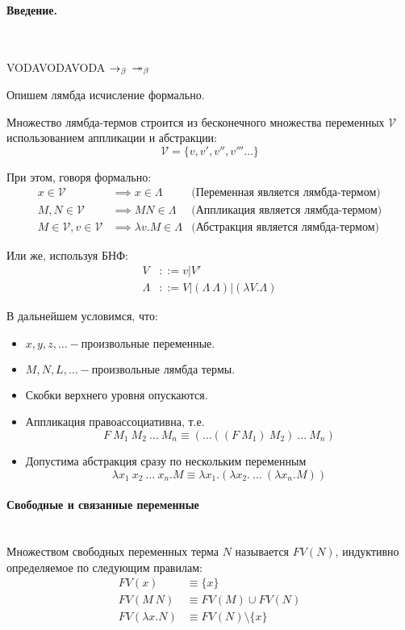 \documentclass[lambda.tex]{subfiles}
\begin{document}
\paragraph{Введение.} ~\\

\begin{tcolorbox}
VODAVODAVODA
$\rightarrow_\beta$
$\twoheadrightarrow_\beta$
\end{tcolorbox}

Опишем лямбда исчисление формально.

Множество лямбда-термов строится из бесконечного множества переменных $\mathcal{V}$ использованием аппликации и абстракции:
\[\mathcal{V} = \{ v, v', v'', v''' \dots \}\]

При этом, говоря формально:
\begin{align*}
x \in \mathcal{V} & \implies x \in \Lambda & \text{(Переменная является лямбда-термом)}\\
M, N \in \mathcal{V} & \implies M N \in \Lambda & \text{(Аппликация является лямбда-термом)}\\
M \in \mathcal{V}, v \in \mathcal{V} & \implies \lambda v.M \in \Lambda & \text{(Абстракция является лямбда-термом)}
\end{align*}

Или же, используя БНФ:
\begin{align*}
V &::= v|V'\\
\Lambda &::= V | (\Lambda\ \Lambda) | ( \lambda V . \Lambda )
\end{align*}

В дальнейшем условимся, что:
\begin{itemize}
\item\(x,y,z,\dots - \text{произвольные переменные.}\)
\item\(M,N,L,\dots - \text{произвольные лямбда термы.}\)
\item Скобки верхнего уровня опускаются.
\item Аппликация правоассоциативна, т.е.\\
\[F\ M_1 \ M_2 \ \dots\ M_n \equiv (\dots((F\ M_1)\ M_2)\ \dots\ M_n)\]
\item Допустима абстракция сразу по нескольким переменным
\[\lambda x_1 \ x_2 \ \dots\ x_n .M \equiv \lambda x_1 .(\lambda x_2 .\ \dots\ (\lambda x_n .M))\]
\end{itemize}

\paragraph{Свободные и связанные переменные} %
\label{par:free_and_bound} ~\\
Множеством свободных переменных терма $N$ называется $FV(N)$, индуктивно определяемое по следующим правилам:
\begin{align*}
FV(x) &\equiv \{x\}\\
FV(M\ N) &\equiv FV(M)\cup FV(N)\\
FV(\lambda x.N) &\equiv FV(N)\setminus\{x\}
\end{align*}
\end{document}

